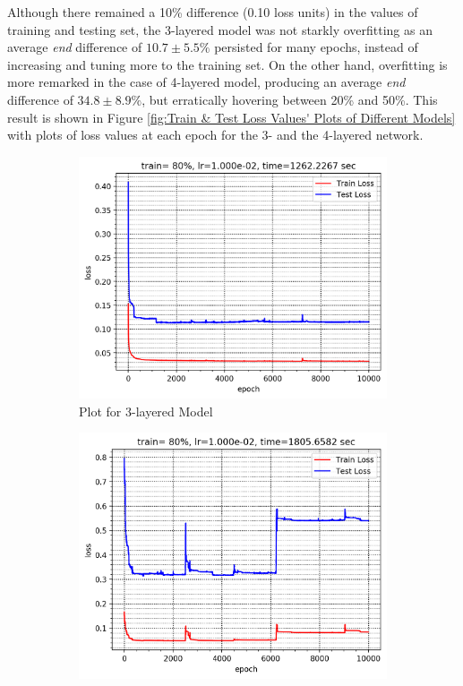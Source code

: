 \documentclass[12pt]{article}
\begin{document}
    Although there remained a 10\% difference (0.10 loss units) in the values of training and testing set, the 3-layered model was not starkly overfitting as an average \textit{end} difference of $10.7\pm5.5\%$ persisted for many epochs, instead of increasing and tuning more to the training set. On the other hand, overfitting is more remarked in the case of 4-layered model, producing an average \textit{end} difference of $34.8\pm8.9\%$, but erratically hovering between 20\% and 50\%. This result is shown in Figure \ref{fig:Train & Test Loss Values' Plots of Different Models} with plots of loss values at each epoch for the 3- and the 4-layered network.
    \begin{figure}[!htbp]
        \centering
        \begin{subfigure}{.49\textwidth}
            \centering
            \includegraphics[width=\textwidth]{weights_train_test_loss_3_plot}
            \caption{Plot for 3-layered Model}
            \label{fig:Plot for 3-layered Model}
        \end{subfigure}
        \begin{subfigure}{.49\textwidth}
            \centering
            \includegraphics[width=\textwidth]{weights_train_test_loss_4_plot}

\end{subfigure}
\end{figure}
\end{document}
